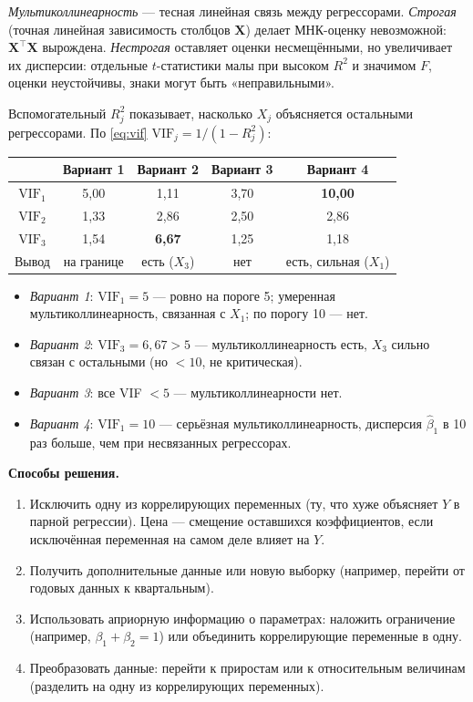 \begin{solution}
\emph{Мультиколлинеарность} — тесная линейная связь между регрессорами.
\emph{Строгая} (точная линейная зависимость столбцов $\mathbf{X}$) делает
МНК-оценку невозможной: $\mathbf{X}^{\top}\mathbf{X}$ вырождена.
\emph{Нестрогая} оставляет оценки несмещёнными, но увеличивает их дисперсии:
отдельные $t$-статистики малы при высоком $R^2$ и значимом $F$, оценки
неустойчивы, знаки могут быть «неправильными».

Вспомогательный $R_j^2$ показывает, насколько $X_j$ объясняется остальными
регрессорами. По \eqref{eq:vif} $\mathrm{VIF}_j = 1/(1 - R_j^2)$:
\begin{center}
\begin{tabular}{ccccc}
\toprule
 & Вариант 1 & Вариант 2 & Вариант 3 & Вариант 4 \\
\midrule
$\mathrm{VIF}_1$ & 5,00 & 1,11 & 3,70 & \textbf{10,00} \\
$\mathrm{VIF}_2$ & 1,33 & 2,86 & 2,50 & 2,86 \\
$\mathrm{VIF}_3$ & 1,54 & \textbf{6,67} & 1,25 & 1,18 \\
\midrule
Вывод & на границе & есть ($X_3$) & нет & есть, сильная ($X_1$) \\
\bottomrule
\end{tabular}
\end{center}
\begin{itemize}[leftmargin=2.2em, itemsep=2pt]
  \item \emph{Вариант 1}: $\mathrm{VIF}_1 = 5$ — ровно на пороге 5;
        умеренная мультиколлинеарность, связанная с $X_1$; по порогу 10 —
        нет.
  \item \emph{Вариант 2}: $\mathrm{VIF}_3 = 6{,}67 > 5$ — мультиколлинеарность
        есть, $X_3$ сильно связан с остальными (но $< 10$, не критическая).
  \item \emph{Вариант 3}: все VIF $< 5$ — мультиколлинеарности нет.
  \item \emph{Вариант 4}: $\mathrm{VIF}_1 = 10$ — серьёзная
        мультиколлинеарность, дисперсия $\widehat{\beta}_1$ в 10 раз больше,
        чем при несвязанных регрессорах.
\end{itemize}

\textbf{Способы решения.}
\begin{enumerate}[label=\arabic*), leftmargin=2.2em, itemsep=2pt]
  \item Исключить одну из коррелирующих переменных (ту, что хуже объясняет
        $Y$ в парной регрессии). Цена — смещение оставшихся коэффициентов,
        если исключённая переменная на самом деле влияет на $Y$.
  \item Получить дополнительные данные или новую выборку (например, перейти
        от годовых данных к квартальным).
  \item Использовать априорную информацию о параметрах: наложить ограничение
        (например, $\beta_1 + \beta_2 = 1$) или объединить коррелирующие
        переменные в одну.
  \item Преобразовать данные: перейти к приростам или к относительным
        величинам (разделить на одну из коррелирующих переменных).
\end{enumerate}
\end{solution}

